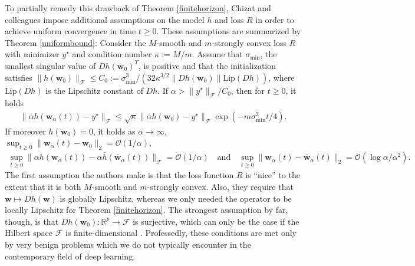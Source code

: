 \documentclass{article}
\newenvironment{manualtheorem}[1]{%
  \renewcommand\themanualtheoreminner{#1}%
  \manualtheoreminner
}{\endmanualtheoreminner}
\begin{document}
To partially remedy this drawback of Theorem \ref{finitehorizon}, Chizat and colleagues impose additional assumptions on the model $h$ and loss $R$ in order to achieve uniform convergence in time $t \geq 0$. These assumptions are summarized by Theorem \ref{uniformbound}:
\begin{manualtheorem}{2.4}\label{uniformbound}
Consider the $M$-smooth and $m$-strongly convex loss $R$ with minimizer $y^{\star}$ and condition number $\kappa := M/m$. Assume that $\sigma_{\text{min}}$, the smallest singular value of $Dh(\boldsymbol{w}_0)^T$, is positive and that the initialization satisfies $\| h(\boldsymbol{w}_0) \|_{\mathcal{F}} \leq C_0:= \sigma_{\text{min}}^3/(32\kappa^{3/2} \| Dh(\boldsymbol{w}_0) \| \text{Lip}(Dh))$, where $\text{Lip}(Dh)$ is the Lipschitz constant of $Dh$. If $\alpha > \| y^{\star} \|_{\mathcal{F}} / C_0$, then for $t \geq 0$, it holds
\begin{align*}
    \| \alpha h(\boldsymbol{w}_{\alpha}(t)) - y^{\star} \|_{\mathcal{F}} \leq \sqrt{\kappa} \| \alpha h(\boldsymbol{w}_0) - y^{\star} \|_{\mathcal{F}} \exp( -m \sigma_{\text{min}}^2 t/4).
\end{align*}
If moreover $h(\boldsymbol{w}_0) = 0$, it holds as $\alpha \rightarrow \infty$, $\sup_{t \geq 0} \| \boldsymbol{w}_{\alpha}(t) - \boldsymbol{w}_0 \|_2 = \mathcal{O}(1/\alpha)$,
\begin{align*}
    \sup_{t \geq 0} \| \alpha h(\boldsymbol{w}_{\alpha}(t)) - \alpha \bar{h}(\boldsymbol{\bar{w}}_{\alpha}(t)) \|_{\mathcal{F}} = \mathcal{O}(1/\alpha) \quad \text{and} \quad  \sup_{t \geq 0} \| \boldsymbol{w}_{\alpha}(t) - \boldsymbol{\bar{w}}_{\alpha}(t) \|_2 = \mathcal{O}(\log \alpha/\alpha^2).
\end{align*}
\end{manualtheorem}
The first assumption the authors make is that the loss function $R$ is \enquote{nice} to the extent that it is both $M$-smooth and $m$-strongly convex. Also, they require that $\boldsymbol{w} \mapsto Dh(\boldsymbol{w})$ is globally Lipschitz, whereas we only needed the operator to be locally Lipschitz for Theorem \ref{finitehorizon}. The strongest assumption by far, though, is that $Dh(\boldsymbol{w}_0): \mathbb{R}^p \rightarrow \mathcal{F}$ is surjective, which can only be the case if the Hilbert space $\mathcal{F}$ is finite-dimensional \cite{chizat2018lazy}. Professedly, these conditions are met only by very benign problems which we do not typically encounter in the contemporary field of deep learning.
\end{document}

